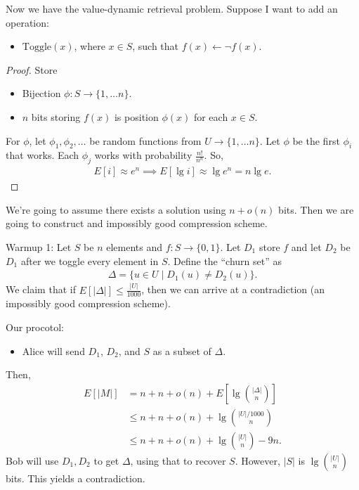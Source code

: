\documentclass{report}
\begin{document}
Now we have the value-dynamic retrieval problem. Suppose I want to add an operation:
\begin{itemize}
    \item $\mathrm{Toggle}(x)$, where $x \in S$, such that $f(x) \leftarrow \lnot f(x)$.
\end{itemize}
\begin{proof}
    Store
    \begin{itemize}
        \item Bijection $\phi: S \to \{1, \ldots n\}$.
        \item $n$ bits storing $f(x)$ is position $\phi(x)$ for each $x \in S$.
    \end{itemize}
    For $\phi$, let $\phi_1, \phi_2, \ldots$ be random functions from $U \to \{1, \ldots n\}$. Let $\phi$ be the first $\phi_i$ that works. Each $\phi_j$ works with probability $\frac{n!}{n^n}$. So,
    \begin{align*}
        E[i] \approx e^n \implies E[\lg i] \approx \lg e^n = n\lg e.
    \end{align*}
\end{proof}
We're going to assume there exists a solution using $n + o(n)$ bits. Then we are going to construct and impossibly good compression scheme. 

\noindent Warmup 1: Let $S$ be $n$ elements and $f: S \to \{0, 1\}$. Let $D_1$ store $f$ and let $D_2$ be $D_1$ after we toggle every element in $S$. Define the ``churn set'' as
\begin{align*}
    \Delta = \{u \in U \mid D_1(u) \neq D_2(u) \}.
\end{align*}
We claim that if $E[| \Delta |] \leq \frac{|U|}{1000}$, then we can arrive at a contradiction (an impossibly good compression scheme).

\noindent Our procotol:
\begin{itemize}
    \item Alice will send $D_1$, $D_2$, and $S$ as a subset of $\Delta$. 
\end{itemize}
Then,
\begin{align*}
    E[|M|] &= n + n + o(n) + E\left[\lg \binom{|\Delta|}{n}\right] \\
    &\leq n + n + o(n) + \lg \binom{|U|/1000}{n}  \tag{skip a few steps} \\
    &\leq n + n + o(n) + \lg \binom{|U|}{n} - 9n. \tag{skip some more}
\end{align*}
Bob will use $D_1, D_2$ to get $\Delta$, using that to recover $S$. However, $|S|$ is $\lg \binom{|U|}{n}$ bits. This yields a contradiction. 
\end{document}
